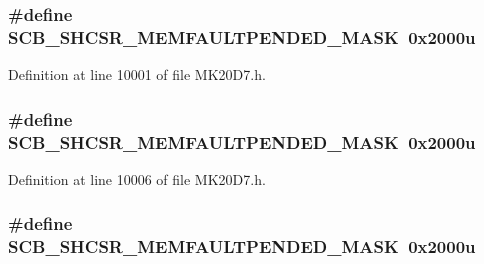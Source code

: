 \subsubsection[{\texorpdfstring{S\+C\+B\+\_\+\+S\+H\+C\+S\+R\+\_\+\+M\+E\+M\+F\+A\+U\+L\+T\+P\+E\+N\+D\+E\+D\+\_\+\+M\+A\+SK}{SCB_SHCSR_MEMFAULTPENDED_MASK}}]{\setlength{\rightskip}{0pt plus 5cm}\#define S\+C\+B\+\_\+\+S\+H\+C\+S\+R\+\_\+\+M\+E\+M\+F\+A\+U\+L\+T\+P\+E\+N\+D\+E\+D\+\_\+\+M\+A\+SK~0x2000u}\hypertarget{group___s_c_b___register___masks_ga56fa72b27b303242795e69b0f5e4c207}{}\label{group___s_c_b___register___masks_ga56fa72b27b303242795e69b0f5e4c207}


Definition at line 10001 of file M\+K20\+D7.\+h.

\subsubsection[{\texorpdfstring{S\+C\+B\+\_\+\+S\+H\+C\+S\+R\+\_\+\+M\+E\+M\+F\+A\+U\+L\+T\+P\+E\+N\+D\+E\+D\+\_\+\+M\+A\+SK}{SCB_SHCSR_MEMFAULTPENDED_MASK}}]{\setlength{\rightskip}{0pt plus 5cm}\#define S\+C\+B\+\_\+\+S\+H\+C\+S\+R\+\_\+\+M\+E\+M\+F\+A\+U\+L\+T\+P\+E\+N\+D\+E\+D\+\_\+\+M\+A\+SK~0x2000u}\hypertarget{group___s_c_b___register___masks_ga56fa72b27b303242795e69b0f5e4c207}{}\label{group___s_c_b___register___masks_ga56fa72b27b303242795e69b0f5e4c207}


Definition at line 10006 of file M\+K20\+D7.\+h.

\subsubsection[{\texorpdfstring{S\+C\+B\+\_\+\+S\+H\+C\+S\+R\+\_\+\+M\+E\+M\+F\+A\+U\+L\+T\+P\+E\+N\+D\+E\+D\+\_\+\+M\+A\+SK}{SCB_SHCSR_MEMFAULTPENDED_MASK}}]{\setlength{\rightskip}{0pt plus 5cm}\#define S\+C\+B\+\_\+\+S\+H\+C\+S\+R\+\_\+\+M\+E\+M\+F\+A\+U\+L\+T\+P\+E\+N\+D\+E\+D\+\_\+\+M\+A\+SK~0x2000u}\hypertarget{group___s_c_b___register___masks_ga56fa72b27b303242795e69b0f5e4c207}{}\label{group___s_c_b___register___masks_ga56fa72b27b303242795e69b0f5e4c207}


